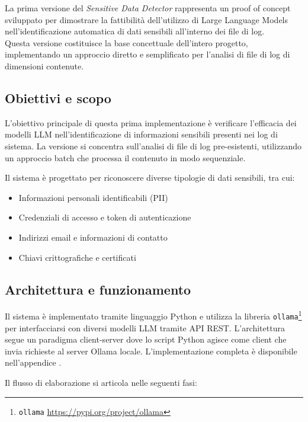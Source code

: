 \documentclass[12pt]{report}
\begin{document}
La prima versione del \textit{Sensitive Data Detector} rappresenta un proof of concept sviluppato per dimostrare la fattibilità dell'utilizzo di Large Language Models nell'identificazione automatica di dati sensibili all'interno dei file di log. \\
Questa versione costituisce la base concettuale dell'intero progetto, implementando un approccio diretto e semplificato per l'analisi di file di log di dimensioni contenute.

\subsection{Obiettivi e scopo}
\label{subsec:ver1_obiettivi}

L'obiettivo principale di questa prima implementazione è verificare l'efficacia dei modelli LLM nell'identificazione di informazioni sensibili presenti nei log di sistema. La versione si concentra sull'analisi di file di log pre-esistenti, utilizzando un approccio batch che processa il contenuto in modo sequenziale.

Il sistema è progettato per riconoscere diverse tipologie di dati sensibili, tra cui:
\begin{itemize}
    \item Informazioni personali identificabili (PII)
    \item Credenziali di accesso e token di autenticazione
    \item Indirizzi email e informazioni di contatto
    \item Chiavi crittografiche e certificati
\end{itemize}

\subsection{Architettura e funzionamento}
\label{subsec:ver1_architettura}

Il sistema è implementato tramite linguaggio Python e utilizza la libreria \texttt{ollama}\footnote{\texttt{ollama} \url{https://pypi.org/project/ollama}} per interfacciarsi con diversi modelli LLM tramite API REST. L'architettura segue un paradigma client-server dove lo script Python agisce come client che invia richieste al server Ollama locale. L'implementazione completa è disponibile nell'appendice .

Il flusso di elaborazione si articola nelle seguenti fasi:
\end{document}
